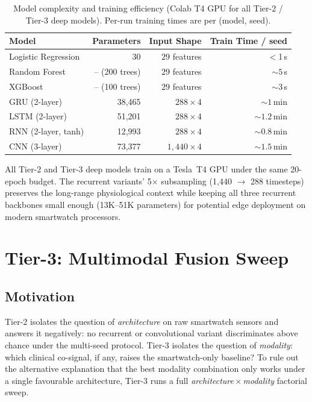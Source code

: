 \documentclass[11pt,a4paper]{article}
\begin{document}
\begin{table}[H]
\centering
\caption{Model complexity and training efficiency (Colab T4 GPU for all
Tier-2 / Tier-3 deep models).  Per-run training times are per (model,
seed).}
\label{tab:efficiency}
\small
\begin{tabular}{lrrr}
\toprule
\textbf{Model} & \textbf{Parameters} & \textbf{Input Shape} &
  \textbf{Train Time / seed} \\
\midrule
Logistic Regression & 30 &  $29$ features & $<$1\,s \\
Random Forest       & -- (200 trees) & $29$ features & ${\sim}5$\,s \\
XGBoost             & -- (100 trees) & $29$ features & ${\sim}3$\,s \\
GRU (2-layer)       & 38{,}465 & $288 \times 4$ & ${\sim}1$\,min \\
LSTM (2-layer)      & 51{,}201 & $288 \times 4$ & ${\sim}1.2$\,min \\
RNN (2-layer, tanh) & 12{,}993 & $288 \times 4$ & ${\sim}0.8$\,min \\
CNN (3-layer)       & 73{,}377 & $1{,}440 \times 4$ & ${\sim}1.5$\,min \\
\bottomrule
\end{tabular}
\end{table}

All Tier-2 and Tier-3 deep models train on a Tesla~T4 GPU under the same
20-epoch budget.  The recurrent variants' 5$\times$ subsampling (1{,}440
$\to$ 288 timesteps) preserves the long-range physiological context while
keeping all three recurrent backbones small enough (13K--51K parameters)
for potential edge deployment on modern smartwatch processors.

\section{Tier-3: Multimodal Fusion Sweep}\label{sec:multimodal}

\subsection{Motivation}

Tier-2 isolates the question of \emph{architecture} on raw smartwatch
sensors and answers it negatively: no recurrent or convolutional variant
discriminates above chance under the multi-seed protocol.  Tier-3
isolates the question of \emph{modality}: which clinical co-signal, if
any, raises the smartwatch-only baseline?  To rule out the alternative
explanation that the best modality combination only works under a single
favourable architecture, Tier-3 runs a full \emph{architecture\,$\times$\,modality}
factorial sweep.
\end{document}
